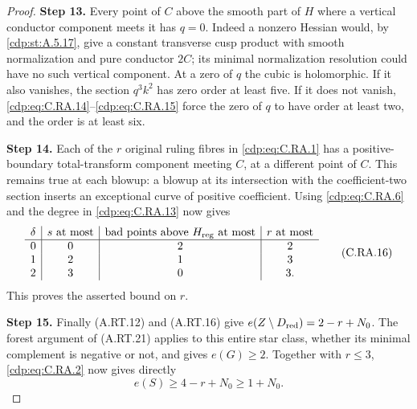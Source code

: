 \begin{proof}
\noindent\textbf{Step 13.} Every point of $C$ above the smooth part of $H$ where a
vertical conductor component meets it has $q=0$.
Indeed a nonzero Hessian would, by \ref{cdp:st:A.5.17}, give a constant
transverse cusp product with smooth normalization and pure
conductor $2C$; its minimal normalization resolution could
have no such vertical component. At a zero of $q$ the
cubic is holomorphic. If it also vanishes, the section
$q^3k^2$ has zero order at least five. If it does not
vanish, \eqref{cdp:eq:C.RA.14}--\eqref{cdp:eq:C.RA.15} force the zero of $q$ to
have order at least two, and the order is at least six.

\noindent\textbf{Step 14.} Each of the $r$ original ruling fibres in \eqref{cdp:eq:C.RA.1} has
a positive-boundary total-transform component meeting $C$,
at a different point of $C$. This remains true at each
blowup: a blowup at its intersection with the coefficient-two
section inserts an exceptional curve of positive coefficient.
Using \eqref{cdp:eq:C.RA.6} and the degree in \eqref{cdp:eq:C.RA.13} now gives
\[
 \begin{array}{c|c|c|c}
 \delta& s\text{ at most}&
 \text{bad points above }H_{\rm reg}\text{ at most}&r\text{ at most}\\ \hline
 0&0&2&2\\
 1&2&1&3\\
 2&3&0&3 .
 \end{array}                                    \tag{C.RA.16}\label{cdp:eq:C.RA.16}
\]
This proves the asserted bound on $r$.

\noindent\textbf{Step 15.} Finally (A.RT.12) and (A.RT.16) give
$e(Z\setminus D_{\rm red})=2-r+N_0$.
The forest argument of (A.RT.21) applies to this entire
star class, whether its minimal complement is negative
or not, and gives $e(G)\ge2$.
Together with $r\le3$, \eqref{cdp:eq:C.RA.2} now gives directly
\[
                 e(S)\ge4-r+N_0\ge1+N_0.
 \tag{C.RA.17}\label{cdp:eq:C.RA.17}
\]
\end{proof}
